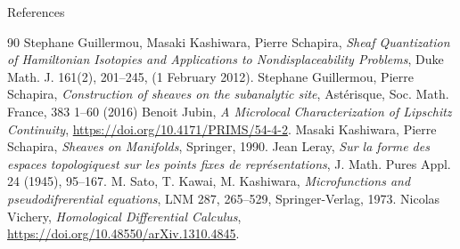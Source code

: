 \documentclass[dvipdfmx,12pt,aspectratio=169,leqno]{beamer}%
\numberwithin{equation}{subsection}
\theoremstyle{mystyle}
\begin{document}
\begin{frame}[allowframebreaks]{References}
    \begin{thebibliography}{90}\beamertemplatetextbibitems
         Stephane Guillermou, 
        Masaki Kashiwara, Pierre Schapira, 
        \textit{Sheaf Quantization of Hamiltonian Isotopies 
        and Applications to Nondisplaceability Problems}, 
        Duke Math. J. 161(2), 201--245, (1 February 2012).
         Stephane Guillermou, Pierre Schapira, 
        \textit{Construction of sheaves on the subanalytic site}, 
        Astérisque, Soc. Math. France, 383 1--60 (2016)
         Benoit Jubin, 
        \textit{A Microlocal Characterization of Lipschitz Continuity}, 
        \url{https://doi.org/10.4171/PRIMS/54-4-2}.
         Masaki Kashiwara, Pierre Schapira, 
        \textit{Sheaves on Manifolds}, Springer, 1990.
         Jean Leray, 
        \textit{Sur la forme des espaces topologiquest sur
        les points fixes de représentations}, J. Math. Pures Appl. 24 (1945), 95--167.
         M. Sato, T. Kawai, M. Kashiwara, 
        \textit{Microfunctions and pseudodifrerential equations}, 
        LNM 287, 265--529, Springer-Verlag, 1973.
         Nicolas Vichery, 
        \textit{Homological Differential Calculus}, \url{https://doi.org/10.48550/arXiv.1310.4845}.
    \end{thebibliography}
\end{frame}

\end{document}
